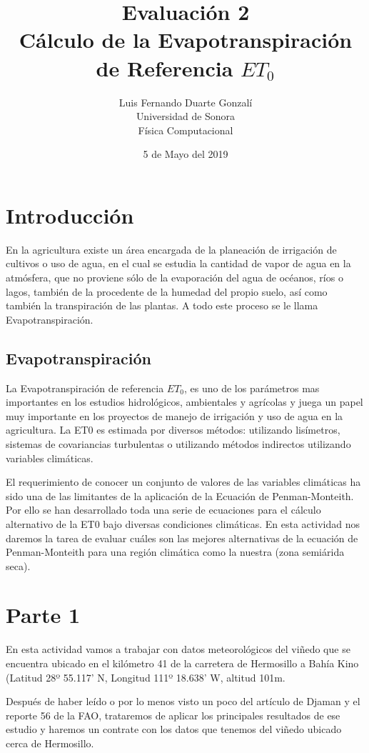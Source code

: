 \documentclass{article}
\title{\textbf{Evaluación 2}\\ Cálculo de la Evapotranspiración de Referencia $ET_0$}
\author{Luis Fernando Duarte Gonzalí \\ Universidad de Sonora \\ Física Computacional}
\date{5 de Mayo del 2019}
\begin{document}
\maketitle


\section{Introducción}
En la agricultura existe un área encargada de la planeación de irrigación de cultivos o uso de agua, en el cual se estudia la cantidad de vapor de agua en la atmósfera, que no proviene sólo de la evaporación del agua de océanos, ríos o lagos, también de la procedente de la humedad del propio suelo, así como también la transpiración de las plantas. A todo este proceso se le llama Evapotranspiración.

\subsection{Evapotranspiración}

La Evapotranspiración de referencia $ET_0$, es uno de los parámetros mas importantes en los estudios hidrológicos, ambientales y agrícolas y juega un papel muy importante en los proyectos de manejo de irrigación y uso de agua en la agricultura. La ET0 es estimada por diversos métodos: utilizando lisímetros, sistemas de covariancias turbulentas o utilizando métodos indirectos utilizando variables climáticas. 

El requerimiento de conocer un conjunto de valores de las variables climáticas ha sido una de las limitantes de la aplicación de la Ecuación de Penman-Monteith. Por ello se han desarrollado toda una serie de ecuaciones para el cálculo alternativo de la ET0 bajo diversas condiciones climáticas. En esta actividad nos daremos la tarea de evaluar cuáles son las mejores alternativas de la ecuación de Penman-Monteith para una región climática como la nuestra (zona semiárida seca).

\section{Parte 1}
En esta actividad vamos a trabajar con datos meteorológicos del viñedo que se encuentra ubicado en el kilómetro 41 de la carretera de Hermosillo a Bahía Kino (Latitud 28º 55.117' N, Longitud 111º 18.638' W, altitud 101m.

Después de haber leído o por lo menos visto un poco del artículo de Djaman y el reporte 56 de la FAO, trataremos de aplicar los principales resultados de ese estudio y haremos un contrate con los datos que tenemos del viñedo ubicado cerca de Hermosillo.
\end{document}
